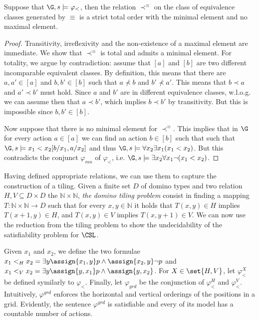 \begin{lemma}
   Suppose that $\G,s\models \varphi_<$, then the relation $\prec^\equiv$ on the class of equivalence classes generated by $\equiv$ is a strict total order with the minimal element and no maximal element. 
\end{lemma}
\begin{proof}
    Transitivity, irreflexivity and the non-existence of a maximal element are immediate.   We show that $\prec^\equiv$ is total and admits a minimal element. For totality, we argue by contradiction: assume that $[a]$ and $[b]$ are two different incomparable equivalent classes. By definition, this means that there are $a,a'\in [a]$ and $b,b'\in [b]$ such that $a \not \prec b$ and $b'\not \prec a'$. This means that $b\prec a$ and $a' \prec b'$ must hold. Since $a$ and $b'$ are in different equivalence classes, %
    w.l.o.g. we can assume then that $a\prec b'$, which implies $b\prec b'$ by transitivity. But this is impossible since $b,b'\in [b]$. 
    
    Now suppose that there is no minimal element for $\prec^\equiv$. This implies that in $\G$ for every action $a \in [a]$ we can find an action $b \in [b]$ such that  such that $\G,s\models x_1 < x_2 [b/x_1, a/x_2]$ and thus $\G,s\models \forall x_2 \exists x_1 (x_1 < x_2)$. But this contradicts the conjunct $\varphi_{mn}$ of $\varphi_<$, i.e. $\G,s\models \exists x_2 \forall x_1 \neg (x_1 < x_2)$. 
\end{proof}
   
Having defined appropriate relations, we can use them to capture the construction of a tiling.
 Given a finite set $D$ of domino types and two relation $H,V\subseteq  D\times D$ the $\mathbb{N}\times \mathbb{N}$, \textit{the domino tiling problem} consist in finding a mapping $T: \mathbb{N}\times \mathbb{N} \to D$ such that for every $x,y\in \mathbb{N}$ it holds that $T(x,y)\in H$ implies $T(x+1,y)\in H$, and $T(x,y)\in V$ implies $T(x,y+1)\in V$. We can now use the reduction from the tiling problem to show the undecidability of the satisfiability problem for $\CSL$.

 
 Given $x_1$ and $x_2$, we define the two formulae $x_1 <_H x_2 = \exists y \assign{x_1,y} p \land \assign{x_2,y} \neg p$  and $x_1<_V x_2= \exists y \assign{y,x_1} p \land \assign{y,x_2}$. For $X\in \set{H,V}$, let $\varphi^X_{<}$ be defined symilarly to $\varphi_<$.
 Finally, let $\varphi_{grd}$ be the conjunction of $\varphi^H_<$ and $\varphi^V_<$. Intuitively, $\varphi^{grd}$ enforces the horizontal and vertical orderings of the positions in a grid.  Evidently, the sentence $\varphi^{grd}$ is satisfiable and every of its model has a countable number of actions. 
 

